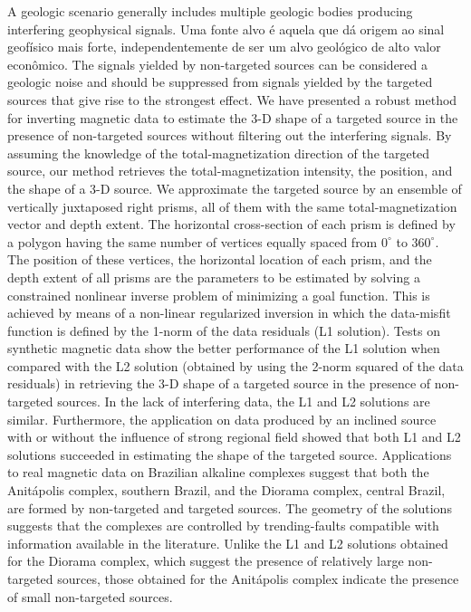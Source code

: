\begin{foreignabstract}

\noindent A geologic scenario generally includes multiple geologic bodies producing interfering geophysical signals.
Uma fonte alvo é aquela que dá origem ao sinal geofísico mais forte, independentemente de ser um alvo geológico de alto valor econômico.
The signals yielded by non-targeted sources can be considered a geologic noise and should be suppressed from signals yielded by the targeted sources that give rise to the strongest effect. 
We have presented a robust method for inverting magnetic data to estimate the 3-D shape of a targeted source in the presence of non-targeted sources without filtering out the interfering signals.
By assuming the knowledge of the total-magnetization direction of the targeted source, our method retrieves the total-magnetization intensity, the position, and the shape of a 3-D source.
We approximate the targeted source by an 
ensemble of vertically juxtaposed right prisms, all of them with the same 
total-magnetization vector and depth extent. The horizontal cross-section 
of each prism is defined by a polygon having the same number of vertices 
equally spaced from $0^{\circ}$ to $360^{\circ}$. The position of these 
vertices, the horizontal location of each prism, and the depth extent of all prisms 
are the parameters to be estimated by solving a constrained nonlinear inverse problem 
of minimizing a goal function. 
This is achieved by means of a non-linear regularized inversion in which the data-misfit function is defined by the 1-norm of the data residuals (L1 solution).
Tests on synthetic magnetic data show the better performance of the L1 solution 
when compared with the L2 solution (obtained by using the 2-norm squared of the data residuals) in retrieving the  3-D shape of a targeted source in the presence of non-targeted sources.
In the lack of interfering data, the L1 and L2 solutions are similar.
Furthermore, the application on data produced by an inclined source with or without the influence of strong regional field showed that both L1 and L2 solutions succeeded in estimating the shape of the targeted source.
Applications to real magnetic data on Brazilian alkaline complexes suggest that both the Anitápolis complex, southern Brazil, and the Diorama complex, central Brazil, are formed by non-targeted and targeted sources.
The geometry of the solutions suggests that the complexes are controlled by trending-faults compatible with information available in the literature.
Unlike the L1 and L2 solutions obtained for the Diorama complex, which suggest the presence of relatively large non-targeted sources, those obtained for the Anitápolis complex indicate the presence of small non-targeted sources.

\end{foreignabstract}

